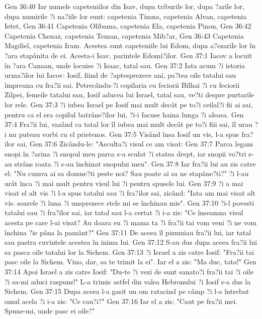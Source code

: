Gen 36:40  Iar numele capeteniilor din Isav, dupa triburile lor, dupa ?arile lor, dupa numirile ?i na?iile lor sunt: capetenia Timna, capetenia Alvan, capetenia Ietet,
Gen 36:41  Capetenia Olibama, capetenia Ela, capetenia Pinon,
Gen 36:42  Capetenia Chenaz, capetenia Teman, capetenia Mib?ar,
Gen 36:43  Capetenia Magdiel, capetenia Iram. Acestea sunt capeteniile lui Edom, dupa a?ezarile lor în ?ara stapânita de ei. Acesta-i Isav, parintele Edomi?ilor.
Gen 37:1  Iacov a locuit în ?ara Canaan, unde locuise ?i Isaac, tatal sau.
Gen 37:2  Iata acum ?i istoria urma?ilor lui Iacov: Iosif, fiind de ?aptesprezece ani, pa?tea oile tatalui sau împreuna cu fra?ii sai. Petrecându-?i copilaria cu feciorii Bilhai ?i cu feciorii Zilpei, femeile tatalui sau, Iosif aducea lui Israel, tatal sau, ve?ti despre purtarile lor rele.
Gen 37:3  ?i iubea Israel pe Iosif mai mult decât pe to?i ceilal?i fii ai sai, pentru ca el era copilul batrâne?ilor lui, ?i-i facuse haina lunga ?i aleasa.
Gen 37:4  Fra?ii lui, vazând ca tatal lor îl iubea mai mult decât pe to?i fiii sai, îl urau ?i nu puteau vorbi cu el prietenos.
Gen 37:5  Visând însa Iosif un vis, l-a spus fra?ilor sai,
Gen 37:6  Zicându-le: "Asculta?i visul ce am visat:
Gen 37:7  Parca legam snopi în ?arina ?i snopul meu parca s-a sculat ?i statea drept, iar snopii vo?tri s-au strâns roata ?i s-au închinat snopului meu".
Gen 37:8  Iar fra?ii lui au zis catre el: "Nu cumva ai sa domne?ti peste noi? Sau poate ai sa ne stapâne?ti?" ?i l-au urât înca ?i mai mult pentru visul lui ?i pentru spusele lui.
Gen 37:9  ?i a mai visat el alt vis ?i l-a spus tatalui sau ?i fra?ilor sai, zicând: "Iata am mai visat alt vis: soarele ?i luna ?i unsprezece stele mi se închinau mie".
Gen 37:10  ?i-l povesti tatalui sau ?i fra?ilor sai, iar tatal sau l-a certat ?i i-a zis: "Ce înseamna visul acesta pe care l-ai visat? Au doara eu ?i mama ta ?i fra?ii tai vom veni ?i ne vom închina ?ie pâna la pamânt?"
Gen 37:11  De aceea îl pizmuiau fra?ii lui, iar tatal sau pastra cuvintele acestea în inima lui.
Gen 37:12  S-au dus dupa aceea fra?ii lui sa pasca oile tatalui lor la Sichem.
Gen 37:13  ?i Israel a zis catre Iosif: "Fra?ii tai pasc oile la Sichem. Vino, dar, sa te trimit la ei". Iar el a zis: "Ma duc, tata!"
Gen 37:14  Apoi Israel a zis catre Iosif: "Du-te ?i vezi de sunt sanato?i fra?ii tai ?i oile ?i sa-mi aduci raspuns!" L-a trimis astfel din valea Hebronului ?i Iosif s-a dus la Sichem.
Gen 37:15  Dupa aceea l-a gasit un om ratacind pe câmp ?i l-a întrebat omul acela ?i i-a zis: "Ce cau?i?"
Gen 37:16  Iar el a zis: "Caut pe fra?ii mei. Spune-mi, unde pasc ei oile?"
